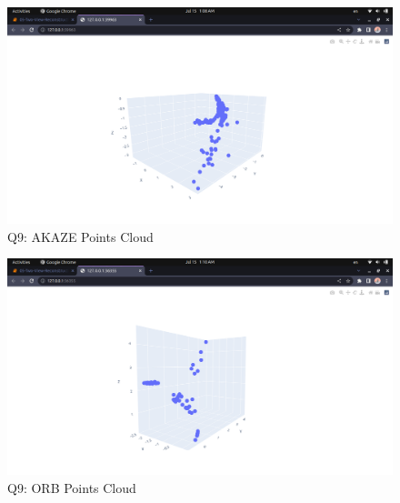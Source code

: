 \documentclass[a4paper, 12pt]{article}
\begin{document}
    \begin{figure}
		\caption{Q9: AKAZE Points Cloud}
		\includegraphics[scale=0.25]{img/akaze_cloud_points.png}
	\end{figure}

    \begin{figure}
		\caption{Q9: ORB Points Cloud}
		\includegraphics[scale=0.25]{img/orb_cloud_points.png}
	\end{figure}
\end{document}
